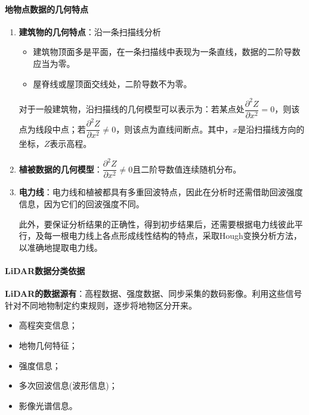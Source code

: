 \paragraph{地物点数据的几何特点}
\begin{enumerate}
	\item \textbf{建筑物的几何特点}：沿一条扫描线分析
		\begin{itemize}
			\item 建筑物顶面多是平面，在一条扫描线中表现为一条直线，数据的二阶导数应当为零。
			\item 屋脊线或屋顶面交线处，二阶导数不为零。
		\end{itemize}
		对于一般建筑物，沿扫描线的几何模型可以表示为：若某点处$ \dfrac{∂^2 Z}{∂x^2} = 0 $，则该点为线段中点；若$ \dfrac{∂^2 Z}{∂x^2} ≠ 0 $，则该点为直线间断点。其中，$ x $是沿扫描线方向的坐标，$ Z $表示高程。
	\item \textbf{植被数据的几何模型}：$ \dfrac{∂^2 Z}{∂x^2} ≠ 0 $且二阶导数值连续随机分布。
	\item \textbf{电力线}：电力线和植被都具有多重回波特点，因此在分析时还需借助回波强度信息，因为它们的回波强度不同。
	
		此外，要保证分析结果的正确性，得到初步结果后，还需要根据电力线彼此平行，及每一根电力线上各点形成线性结构的特点，采取Hough变换分析方法，以准确地提取电力线。
\end{enumerate}

\paragraph{LiDAR数据分类依据}
\textbf{LiDAR的数据源有}：高程数据、强度数据、同步采集的数码影像。利用这些信号针对不同地物制定约束规则，逐步将地物区分开来。
\begin{itemize}
	\item 高程突变信息；
	\item 地物几何特征；
	\item 强度信息；
	\item 多次回波信息(波形信息)；
	\item 影像光谱信息。
\end{itemize}

